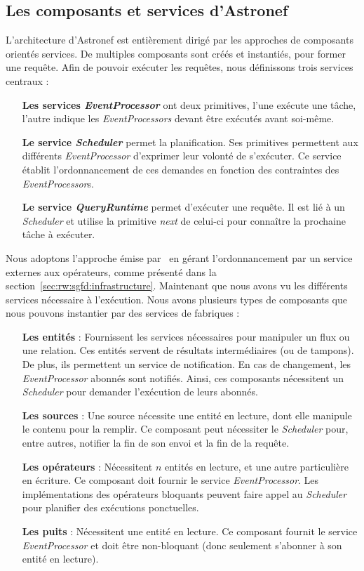 \subsection{Les composants et services d'Astronef}
L'architecture d'Astronef est entièrement dirigé par les approches de composants orientés services. De multiples composants sont créés et instantiés, pour former une requête. Afin de pouvoir exécuter les requêtes, nous définissons trois services centraux :
\begin{itemize}
	\item[\textbf{Les services \textit{EventProcessor}}] ont deux primitives, l'une exécute une tâche, l'autre indique les \textit{EventProcessors} devant être exécutés avant soi-même.
	\item[\textbf{Le service \textit{Scheduler}}] permet la planification. Ses primitives permettent aux différents \textit{EventProcessor} d'exprimer leur volonté de s'exécuter. Ce service établit l'ordonnancement de ces demandes en fonction des contraintes des \textit{EventProcessor}s.
	\item[\textbf{Le service \textit{QueryRuntime}}] permet d'exécuter une requête. Il est lié à un \textit{Scheduler} et utilise la primitive \textit{next} de celui-ci pour connaître la prochaine tâche à exécuter.
\end{itemize}

Nous adoptons l'approche émise par~\cite{Carney:scheduling} en gérant l'ordonnancement par un service externes aux opérateurs, comme présenté dans la section~\ref{sec:rw:sgfd:infrastructure}. Maintenant que nous avons vu les différents services nécessaire à l'exécution. Nous avons plusieurs types de composants que nous pouvons instantier par des services de fabriques :
\begin{itemize}
	\item[\textbf{Les entités}] : Fournissent les services nécessaires pour manipuler un flux ou une relation. Ces entités servent de résultats intermédiaires (ou de tampons). De plus, ils permettent un service de notification. En cas de changement, les \textit{EventProcessor} abonnés sont notifiés. Ainsi, ces composants nécessitent un \textit{Scheduler} pour demander l'exécution de leurs abonnés.
	\item[\textbf{Les sources}] : Une source nécessite une entité en lecture, dont elle manipule le contenu pour la remplir. Ce composant peut nécessiter le \textit{Scheduler} pour, entre autres, notifier la fin de son envoi et la fin de la requête.
	\item[\textbf{Les opérateurs}] : Nécessitent $n$ entités en lecture, et une autre particulière en écriture. Ce composant doit fournir le service \textit{EventProcessor}. Les implémentations des opérateurs bloquants peuvent faire appel au \textit{Scheduler} pour planifier des exécutions ponctuelles.
	\item[\textbf{Les puits}] : Nécessitent une entité en lecture. Ce composant fournit le service \textit{EventProcessor} et doit être non-bloquant (donc seulement s'abonner à son entité en lecture).
\end{itemize}

